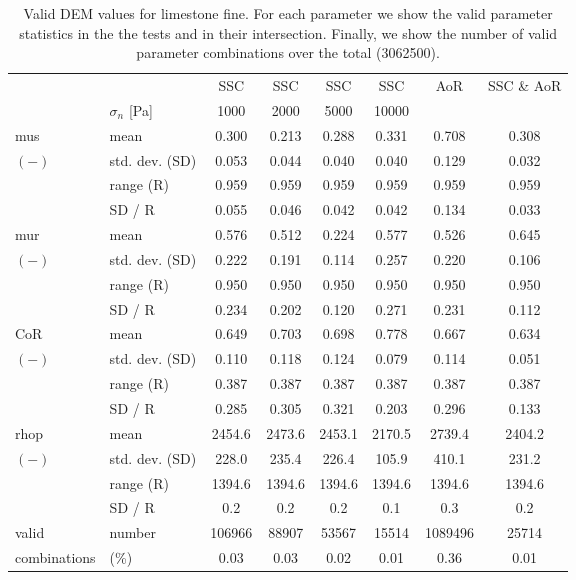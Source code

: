 \begin{table}[htbp] 
 \centering 
\begin{tabular}{ll|cccccc} 
 \hline 
 &    & SSC & SSC & SSC & SSC & AoR   & SSC \& AoR \\ 
 & $\sigma_n$  [Pa]  & 1000 & 2000 & 5000 & 10000 &   &  \\ 
 \hline 
\acs{mus} & mean & 0.300 & 0.213 & 0.288 & 0.331 & 0.708 & 0.308 \\ 
$(-)$ & std. dev. (SD) & 0.053 & 0.044 & 0.040 & 0.040 & 0.129 & 0.032 \\ 
 & range (\acs{R}) & 0.959 & 0.959 & 0.959 & 0.959 & 0.959 & 0.959 \\ 
 & SD / R & 0.055 & 0.046 & 0.042 & 0.042 & 0.134 & 0.033 \\ 
 \hline 
\acs{mur} & mean & 0.576 & 0.512 & 0.224 & 0.577 & 0.526 & 0.645 \\ 
$(-)$ & std. dev. (SD) & 0.222 & 0.191 & 0.114 & 0.257 & 0.220 & 0.106 \\ 
 & range (\acs{R}) & 0.950 & 0.950 & 0.950 & 0.950 & 0.950 & 0.950 \\ 
 & SD / R & 0.234 & 0.202 & 0.120 & 0.271 & 0.231 & 0.112 \\ 
 \hline 
\acs{CoR} & mean & 0.649 & 0.703 & 0.698 & 0.778 & 0.667 & 0.634 \\ 
$(-)$ & std. dev. (SD) & 0.110 & 0.118 & 0.124 & 0.079 & 0.114 & 0.051 \\ 
 & range (\acs{R}) & 0.387 & 0.387 & 0.387 & 0.387 & 0.387 & 0.387 \\ 
 & SD / R & 0.285 & 0.305 & 0.321 & 0.203 & 0.296 & 0.133 \\ 
 \hline 
\acs{rhop} & mean & 2454.6 & 2473.6 & 2453.1 & 2170.5 & 2739.4 & 2404.2 \\ 
$(-)$ & std. dev. (SD) & 228.0 & 235.4 & 226.4 & 105.9 & 410.1 & 231.2 \\ 
 & range (\acs{R}) & 1394.6 & 1394.6 & 1394.6 & 1394.6 & 1394.6 & 1394.6 \\ 
 & SD / R &  0.2 &  0.2 &  0.2 &  0.1 &  0.3 &  0.2 \\ 
 \hline 
valid & number & 106966 & 88907 & 53567 & 15514 & 1089496 & 25714 \\ 
combinations & (\%)  & 0.03 & 0.03 & 0.02 & 0.01 & 0.36 & 0.01 \\ 
 \hline 
\end{tabular} 
\caption[Valid DEM values for limestone fine]{Valid DEM values for
limestone fine. For each parameter we show the valid parameter statistics in the
the tests and in their intersection. Finally, we show the number of valid parameter combinations over the total (3062500).}
\label{tab:30DEMvalidvalueslimestonefine} 
\end{table}